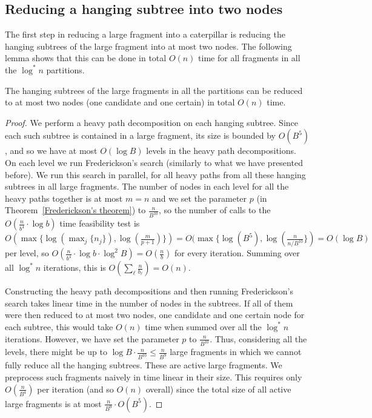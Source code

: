 \documentclass[a4paper,UKenglish]{lipics-v2016}
\theoremstyle{plain}
\begin{document}
\subsection{Reducing a hanging subtree into two nodes}\label{section:lemma1}
The first step in reducing a large fragment into a caterpillar is reducing the hanging subtrees of the large fragment into at most two nodes. The following lemma shows that this can be done in total $O(n)$ time for all fragments in all the $\log^* n$ partitions.

\begin{lemma}\label{lemma1}
The hanging subtrees of the large fragments in all the partitions can be reduced to at most two nodes (one candidate and one certain) in total $O(n)$ time. 
\end{lemma}
\begin{proof}
We perform a heavy path decomposition on each hanging subtree. Since each such subtree is contained in a large fragment, its 
size is bounded by $O(B^5)$, and so we have at most $O(\log B)$ levels in the heavy 
path decompositions. On each level we run Frederickson's search (similarly to what we have presented before).
We run this search in parallel, for all heavy paths from all these hanging subtrees in all large fragments.
The number of  nodes in each level for all the heavy paths together is at most $m=n$ and we set
the parameter $p$ (in Theorem~\ref{Frederickson's theorem}) to $\frac{n}{B^{10}}$, so the number of calls to the $O(\frac{n}{b^4} \cdot \log b)$ time feasibility test
is $O(\max \lbrace \log(\max_{j} \lbrace n_j \rbrace), \log(\frac{m}{p+1}) \rbrace) = O(\max \lbrace \log (B^{5}), \log(\frac{n}{n/B^{10}} \rbrace) = O(\log B)$ per level, so
$O(\frac{n}{b^4} \cdot \log b \cdot \log^{2} B) = O(\frac{n}{b})$ for every iteration.
Summing over all $\log^{*}n$ iterations, this is $O(\sum_{\ell}\frac{n}{b_\ell}) = O(n)$.

Constructing the heavy path decompositions and then running Frederickson's search takes linear time in the number
of nodes in the subtrees. If all of them were then reduced to at most two nodes, one candidate and one certain
node for each subtree, this would take $O(n)$ time when summed over all the $\log^{*}n$  iterations. However, we have set
the parameter $p$ to $\frac{n}{B^{10}}$. Thus, considering all the levels, there
might be up to $\log B\cdot\frac{n}{B^{10}}\leq \frac{n}{B^{9}}$ large fragments in which we cannot fully reduce
all the hanging subtrees. These are active large fragments. We preprocess such fragments naively in time linear in their size. 
This requires only $O(\frac{n}{B^{4}})$ per iteration (and so $O(n)$ overall) since the total size of all active large fragments is at most
$\frac{n}{B^9} \cdot O(B^5)$. 
\end{proof}
\end{document}
